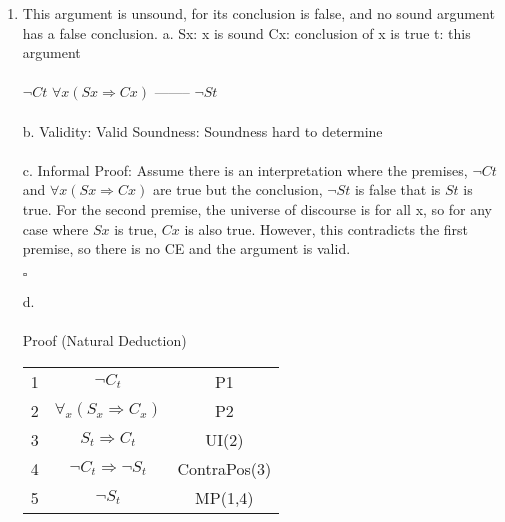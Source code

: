 \documentclass[]{article}
\begin{document}
\begin{enumerate}
    \item This argument is unsound, for its conclusion is false, and no sound argument has a false conclusion.
    \newline a.
    \newline Sx: x is sound
    \newline Cx: conclusion of x is true
    \newline t: this argument
    \\\\ $\neg Ct$
    \newline $\forall x (Sx \Rightarrow Cx)$
    \newline --------
    \newline $\neg St$
    \\\\b.
    \newline Validity: Valid
    \newline Soundness: Soundness hard to determine
    \\\\c.
    \newline Informal Proof:
    \newline Assume there is an interpretation where the premises, $\neg Ct$ and $\forall x(Sx \Rightarrow Cx)$ are true but the conclusion, $\neg St$ is false that is $St$ is true. For the second premise, the universe of discourse is for all x, so for any case where $Sx$ is true, $Cx$ is also true. However, this contradicts the first premise, so there is no CE and the argument is valid.
    \begin{flushright}
    $\square$
    \end{flushright}
    d.
    \\\\ Proof (Natural Deduction)
    \begin{tabular}{c| c | c}
        1 & $\neg C_t$ & P1 \\
        2 & $\forall_x (S_x \Rightarrow C_x)$ & P2 \\
        3 & $S_t \Rightarrow C_t$ & UI(2) \\
        4 & $\neg C_t \Rightarrow \neg S_t$ & ContraPos(3) \\
        5 & $\neg S_t$ & MP(1,4) \\
    \end{tabular}


\end{enumerate}
\end{document}

